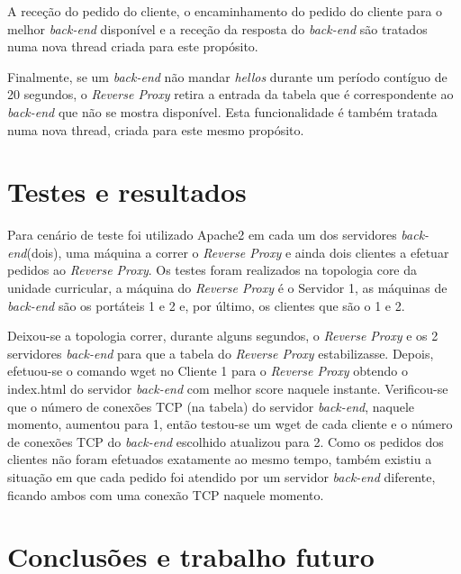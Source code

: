 \documentclass{llncs}
\begin{document}
\begin{itemize}
	A receção do pedido do cliente, o encaminhamento do pedido do cliente para o melhor \textit{back-end} disponível e a receção da resposta do \textit{back-end} são tratados numa nova thread criada para este propósito. \par
	Finalmente, se um \textit{back-end} não mandar \textit{hellos} durante um período contíguo de 20 segundos, o \textit{Reverse Proxy} retira a entrada da tabela que é correspondente ao \textit{back-end} que não se mostra disponível. Esta funcionalidade é também tratada numa nova thread, criada para este mesmo propósito.
	
	
	

\end{itemize}
\newpage

\section{Testes e resultados}

Para cenário de teste foi utilizado Apache2 em cada um dos servidores \textit{back-end}(dois),
uma máquina a correr o \textit{Reverse Proxy} e ainda dois clientes a efetuar pedidos ao \textit{Reverse Proxy}. Os testes foram realizados na topologia core da unidade curricular, a máquina do \textit{Reverse Proxy} é o Servidor 1, as máquinas de \textit{back-end} são os portáteis 1 e 2 e, por último, os clientes que são o 1 e 2.\par
Deixou-se a topologia correr, durante alguns segundos, o \textit{Reverse Proxy} e os 2 servidores \textit{back-end} para que a tabela do \textit{Reverse Proxy} estabilizasse. Depois, efetuou-se o comando wget no Cliente 1 para o \textit{Reverse Proxy} obtendo o index.html do servidor \textit{back-end} com melhor score naquele instante. Verificou-se que o número de conexões TCP (na tabela) do servidor \textit{back-end}, naquele momento, aumentou para 1, então testou-se um wget de cada cliente e o número de conexões TCP do \textit{back-end} escolhido atualizou para 2. Como os pedidos dos clientes não foram efetuados exatamente ao mesmo tempo, também existiu a situação em que cada pedido foi atendido por um servidor \textit{back-end} diferente, ficando ambos com uma conexão TCP naquele momento.

\newpage

\section{Conclusões e trabalho futuro}
\end{document}
